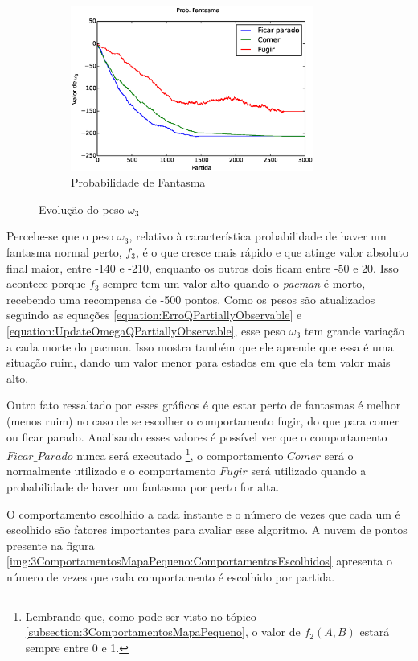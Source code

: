 \begin{figure}[h]
	\centering
	\begin{subfigure}[t]{.5\textwidth}
		\centering
		\includegraphics[width=80mm]{images/3_behaviors_small_map/weights____pol__ProbFantasma}
		\caption{Probabilidade de Fantasma}
	\end{subfigure}
	\caption{Evolução do peso $ \omega_3 $}
	\label{img:3ComportamentosMapaPequeno:PesoProbFantasma}
\end{figure}

Percebe-se que o peso $ \omega_3 $, relativo à característica probabilidade de haver um fantasma normal perto, $ f_3 $, é o que cresce mais rápido e que atinge valor absoluto final maior, entre -140 e -210, enquanto os outros dois ficam entre -50 e 20. Isso acontece porque $ f_3 $ sempre tem um valor alto quando o \textit{pacman} é morto, recebendo uma recompensa de -500 pontos. Como os pesos são atualizados seguindo as equações \ref{equation:ErroQPartiallyObservable} e \ref{equation:UpdateOmegaQPartiallyObservable}, esse peso $ \omega_3 $ tem grande variação a cada morte do pacman. Isso mostra também que ele aprende que essa é uma situação ruim, dando um valor menor para estados em que ela tem valor mais alto.

Outro fato ressaltado por esses gráficos é que estar perto de fantasmas é melhor (menos ruim) no caso de se escolher o comportamento fugir, do que para comer ou ficar parado. Analisando esses valores é possível ver que o comportamento $ Ficar\_Parado $ nunca será executado%
\footnote{Lembrando que, como pode ser visto no tópico \ref{subsection:3ComportamentosMapaPequeno}, o valor de $ f_2 \left( A, B \right) $ estará sempre entre 0 e 1.%
}, o comportamento $ Comer $ será o normalmente utilizado e o comportamento $ Fugir $ será utilizado quando a probabilidade de haver um fantasma por perto for alta.

O comportamento escolhido a cada instante e o número de vezes que cada um é escolhido são fatores importantes para avaliar esse algoritmo. A nuvem de pontos presente na figura \ref{img:3ComportamentosMapaPequeno:ComportamentosEscolhidos} apresenta o número de vezes que cada comportamento é escolhido por partida.

